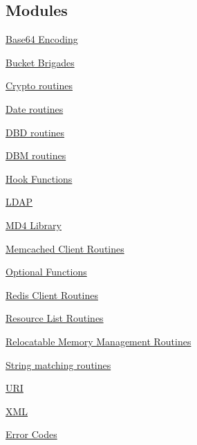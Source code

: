 \subsection*{Modules}
\begin{DoxyCompactItemize}
\item 
\hyperlink{group__APR__Util__Base64}{Base64 Encoding}
\item 
\hyperlink{group__APR__Util__Bucket__Brigades}{Bucket Brigades}
\item 
\hyperlink{group__APR__Util__Crypto}{Crypto routines}
\item 
\hyperlink{group__APR__Util__Date}{Date routines}
\item 
\hyperlink{group__APR__Util__DBD}{D\+B\+D routines}
\item 
\hyperlink{group__APR__Util__DBM}{D\+B\+M routines}
\item 
\hyperlink{group__APR__Util__Hook}{Hook Functions}
\item 
\hyperlink{group__APR__Util__LDAP}{L\+D\+AP}
\item 
\hyperlink{group__APR__Util__MD4}{M\+D4 Library}
\item 
\hyperlink{group__APR__Util__MC}{Memcached Client Routines}
\item 
\hyperlink{group__APR__Util__Opt}{Optional Functions}
\item 
\hyperlink{group__APR__Util__RC}{Redis Client Routines}
\item 
\hyperlink{group__APR__Util__RL}{Resource List Routines}
\item 
\hyperlink{group__APR__Util__RMM}{Relocatable Memory Management Routines}
\item 
\hyperlink{group__APR__Util__StrMatch}{String matching routines}
\item 
\hyperlink{group__APR__Util__URI}{U\+RI}
\item 
\hyperlink{group__APR__Util__XML}{X\+ML}
\item 
\hyperlink{group__apu__errno}{Error Codes}
\end{DoxyCompactItemize}
